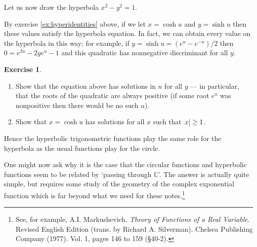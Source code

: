 \documentclass[a4paper,leqno]{article}
\numberwithin{equation}{section}
\theoremstyle{definition}
\newtheorem{exercise}[equation]{Exercise}
\theoremstyle{remark}
\begin{document}
Let us now draw the hyperbola $ x^2 - y^2 = 1 $.
\begin{center}
\end{center}

By exercise \ref{ex:hyperidentities} above, if we let $ x = \cosh u $ and $ y = \sinh u $ then these
values satisfy the hyperbola equation. In fact, we can obtain every value on the hyperbola in this way;
for example, if $ y = \sinh u = (e^u - e^{-u})/2 $ then $ 0 = e^{2u} - 2ye^u - 1 $ and this quadratic
has nonnegative discriminant for all $ y $.

\begin{exercise}\leavevmode
  \begin{enumerate}
    \item Show that the equation above has solutions in $ u $ for all $ y $ --- in particular, that the
          roots of the quadratic are always positive (if some root $ e^u $ was nonpositive then there would
          be no such $ u $).
    \item Show that $ x = \cosh u $ has solutions for all $ x $ such that $ \abs{x} \geq 1 $.
  \end{enumerate}
\end{exercise}

Hence the hyperbolic trigonometric functions play the same role for the hyperbola as the usual functions
play for the circle.

One might now ask why it is the case that the circular functions and hyperbolic functions seem to be
related by `passing through $ \mathbb{C} $'. The answer is actually quite simple, but requires some study
of the geometry of the complex exponential function which is far beyond what we need for these notes.\footnote{See, for example, A.I. Markushevich, \emph{Theory of Functions of a Real Variable}. Revised English Edition (trans. by Richard A. Silverman). Chelsea Publishing Company (1977). Vol. 1, pages 146 to 159 (\S40-2).  }
\end{document}

